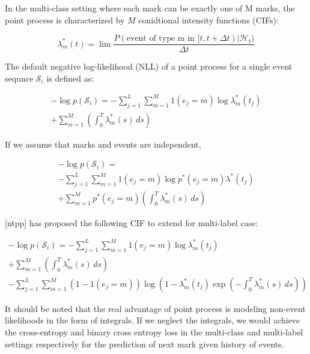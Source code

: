 \documentclass[journal,twoside,web]{ieeecolor}
\begin{document}
In the multi-class setting where each mark can be exactly one of M marks, the point process is characterized by $M$ conidtional intensity functions (CIFs):

\begin{equation}\label{eq:11}
   \lambda_m^{*}(t)=\lim \frac{P(  \text{event of type m in } [t,t+\Delta t) |   \mathcal{H}_t  )}{\Delta t} 
\end{equation} 


The default negative log-likelihood (NLL) of a point process for a single event sequnce $\mathcal{S}_{i}$ is defined as:

\begin{multline}\label{eq:11}
    -\log p(\mathcal{S}_{i})  =  - \sum_{j = 1}^{L}\sum_{m = 1}^{M} 1(e_j=m)   \log \lambda_m^{*}(t_j) \\   
    + \sum_{m = 1}^{M} \left(   \int_{0}^{T}  \lambda_m^{*}(s) \,ds  \right)
\end{multline} 


If we assume that marks and events are independent, 

\begin{multline}\label{eq:11}
    -\log p(\mathcal{S}_{i})  = \\
      - \sum_{j = 1}^{L}\sum_{m = 1}^{M} 1(e_j=m)   \log p^{*}(e_j=m) \lambda^{*}(t_j) \\   
    + \sum_{m = 1}^{M} p^{*}(e_j=m) \left(   \int_{0}^{T}  \lambda_m^{*}(s) \,ds  \right)
\end{multline} 


[ntpp] has proposed the following CIF to extend for multi-label case:

\begin{multline}\label{eq:11}
    -\log p(\mathcal{S}_{i})  =  - \sum_{j = 1}^{L}\sum_{m = 1}^{M} 1(e_j=m)   \log \lambda_m^{*}(t_j) \\   
    + \sum_{m = 1}^{M} \left(   \int_{0}^{T}  \lambda_m^{*}(s) \,ds  \right)\\
    - \sum_{j = 1}^{L}\sum_{m = 1}^{M} (1-1(e_j=m)) \log \left(1-\lambda_m^{*}(t_j) \exp \left( - \int_{0}^{T}  \lambda_m^{*}(s) \,ds  \right) \right)
\end{multline} 

It should be noted that the real advantage of point process is modeling non-event likelihoods in the form of integrals. If we neglect the integrals, we would achieve the cross-entropy and binary cross entropy loss in the multi-class and multi-label settings respectively for the prediction of next mark given history of events.
\end{document}
